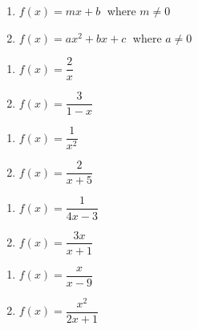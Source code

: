 {\begin{multicols}{2}
\begin{enumerate}
\item $f(x) = mx + b\;$ where $m \neq 0$
\item $f(x) = ax^{2} + bx + c\;$ where $a \neq 0$

\setcounter{HW}{\value{enumi}}
\end{enumerate}
\end{multicols}

\begin{multicols}{2}
\begin{enumerate}
\setcounter{enumi}{\value{HW}}

\item $f(x) = \dfrac{2}{x}$
\item $f(x) = \dfrac{3}{1-x}$

\setcounter{HW}{\value{enumi}}
\end{enumerate}
\end{multicols}

\begin{multicols}{2}
\begin{enumerate}
\setcounter{enumi}{\value{HW}}

\item  $f(x) = \dfrac{1}{x^2}$
\item  $f(x) = \dfrac{2}{x+5}$

\setcounter{HW}{\value{enumi}}
\end{enumerate}
\end{multicols}

\begin{multicols}{2}
\begin{enumerate}
\setcounter{enumi}{\value{HW}}

\item $f(x) = \dfrac{1}{4x-3}$ 
\item $f(x) = \dfrac{3x}{x+1}$ 

\setcounter{HW}{\value{enumi}}
\end{enumerate}
\end{multicols}

\begin{multicols}{2}
\begin{enumerate}
\setcounter{enumi}{\value{HW}}

\item $f(x) = \dfrac{x}{x - 9}$
\item $f(x) = \dfrac{x^2}{2x+1}$

\setcounter{HW}{\value{enumi}}
\end{enumerate}
\end{multicols}

}
